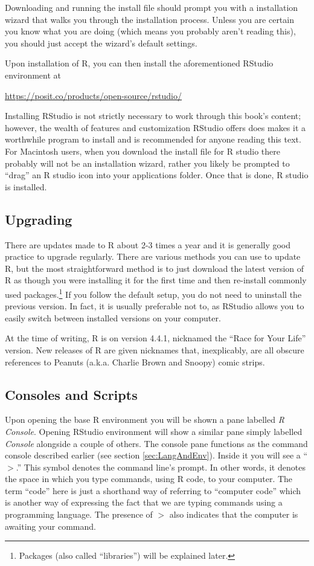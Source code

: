 Downloading and running the install file should prompt you with a installation wizard that walks you through the installation process. Unless you are certain you know what you are doing (which means you probably aren't reading this), you should just accept the wizard's default settings.

Upon installation of R, you can then install the aforementioned RStudio environment at

\begin{center}
\url{https://posit.co/products/open-source/rstudio/}
\end{center}

Installing RStudio is not strictly necessary to work through this book's content; however, the wealth of features and customization RStudio offers does makes it a worthwhile program to install and is recommended for anyone reading this text. For Macintosh users, when you download the install file for R studio there probably will not be an installation wizard, rather you likely be prompted to ``drag'' an R studio icon into your applications folder. Once that is done, R studio is installed.

\subsection{Upgrading}

There are updates made to R about 2-3 times a year and it is generally good practice to upgrade regularly. There are various methods you can use to update R, but the most straightforward method is to just download the latest version of R as though you were installing it for the first time and then re-install commonly used packages.\footnote{Packages (also called ``libraries'') will be explained later.} If you follow the default setup, you do not need to uninstall the previous version. In fact, it is usually preferable not to, as RStudio allows you to easily switch between installed versions on your computer.

At the time of writing, R is on version 4.4.1, nicknamed the ``Race for Your Life'' version.  New releases of R are given nicknames that, inexplicably, are all obscure references to Peanuts (a.k.a. Charlie Brown and Snoopy) comic strips.

\subsection{Consoles and Scripts}

Upon opening the base R environment you will be shown a pane labelled \textit{R Console}.  Opening RStudio environment will show a similar pane simply labelled \textit{Console} alongside a couple of others.  The console pane functions as the command console described earlier (see section \ref{sec:LangAndEnv}).  Inside it you will see a ``$>$.'' This symbol denotes the command line's prompt.  In other words, it denotes the space in which you type commands, using R code, to your computer.  The term ``code'' here is just a shorthand way of referring to ``computer code'' which is another way of expressing the fact that we are typing commands using a programming language. The presence of $>$ also indicates that the computer is awaiting your command.

